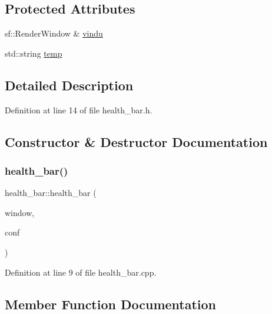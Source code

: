 \subsection*{Protected Attributes}
\begin{DoxyCompactItemize}
\item 
sf\+::\+Render\+Window \& \hyperlink{classhealth__bar_af18cd32e25dd9a6d699aed82dcf1c81c}{vindu}
\item 
std\+::string \hyperlink{classhealth__bar_a3c36fece875720fe40d8619ab466a5bd}{temp}
\end{DoxyCompactItemize}


\subsection{Detailed Description}


Definition at line 14 of file health\+\_\+bar.\+h.



\subsection{Constructor \& Destructor Documentation}
\hypertarget{classhealth__bar_aab2af089c751952555ee45a802d9c297}{}\label{classhealth__bar_aab2af089c751952555ee45a802d9c297} 
\subsubsection{\texorpdfstring{health\+\_\+bar()}{health\_bar()}}
{\footnotesize\ttfamily health\+\_\+bar\+::health\+\_\+bar (\begin{DoxyParamCaption}\item[{sf\+::\+Render\+Window \&}]{window,  }\item[{\hyperlink{class_config}{Config} \&}]{conf }\end{DoxyParamCaption})}



Definition at line 9 of file health\+\_\+bar.\+cpp.



\subsection{Member Function Documentation}
\hypertarget{classhealth__bar_a06b20deda0e6c34cc947e8c1aa63c4c8}{}\label{classhealth__bar_a06b20deda0e6c34cc947e8c1aa63c4c8} 
